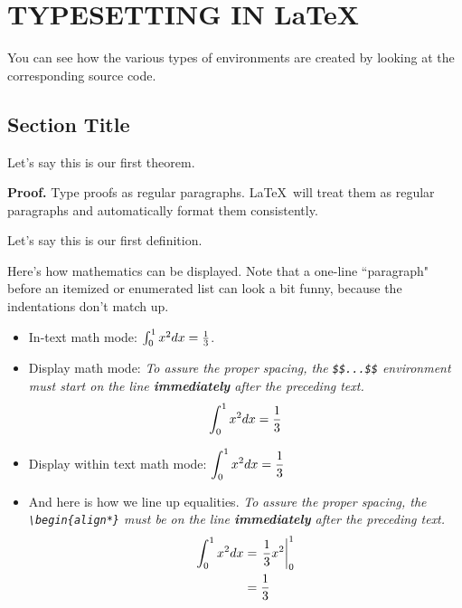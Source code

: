 \chapter{TYPESETTING IN \LaTeX }\label{chap2:latex}


You can see how the various types of environments
are created by looking at the corresponding source code.


\section{Section Title}

\begin{theorem}
\label{th1}

Let's say this is our first theorem.

\end{theorem}


{\bf Proof.}
Type proofs as regular paragraphs. \LaTeX \ will treat them as
regular paragraphs and automatically format them consistently.


\begin{definition}
\label{def1}

Let's say this is our first definition.

\end{definition}


Here's how mathematics can be displayed.
Note that a one-line ``paragraph" before an
itemized or enumerated list can look a bit funny, because the
indentations don't match up.

\begin{itemize}
\item
In-text math mode: $\int _0 ^1 x^2 dx = {1\over 3}$.

\item
Display  math mode:
{\em
To assure the proper spacing, the \verb+$$...$$+ environment
must start on the line {\bf immediately} after the preceding text.}
$$\int _0 ^1 x^2 dx = {1\over 3}$$

\item
Display within text math mode: 
$\displaystyle{ \int _0 ^1 x^2 dx = {1\over 3} } $

\item
And here is how we line up equalities.
{\em To assure the proper spacing, the \verb+\begin{align*}+
must be on the line {\bf immediately} after the preceding text.}
\begin{align*}
\int _0 ^1 x^2 dx
& =
\left. {1\over 3} x^2 \right| _{0} ^1
\\
& =
{1\over 3}
\end{align*}

\end{itemize}


